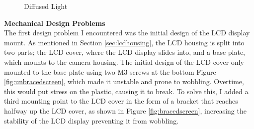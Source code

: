 \begin{figure}
\begin{minipage}[t]{0.49\textwidth}
        \caption{Diffused Light}
        \label{fig:diffusedlight}
    \end{minipage}
\end{figure}

\noindent
\textbf{Mechanical Design Problems} \\
The first design problem I encountered was the initial design of the LCD display mount. As mentioned in Section \ref*{sec:lcdhousing},
the LCD housing is split into two parts; the LCD cover, where the LCD display slides into, and a base plate, which mounts to the camera housing.
The initial design of the LCD cover only mounted to the base plate using two M3 screws at the bottom Figure \ref*{fig:unbracedscreen}, which made it unstable and prone to wobbling.
Overtime, this would put stress on the plastic, causing it to break. To solve this, I added a third mounting point to the LCD cover in the form of a 
bracket that reaches halfway up the LCD cover, as shown in Figure \ref*{fig:bracedscreen}, increasing the stability of the LCD display preventing it from wobbling.

